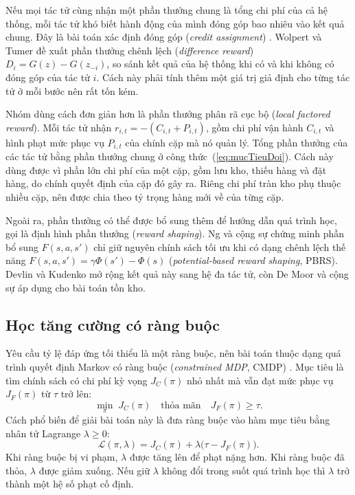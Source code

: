 Nếu mọi tác tử cùng nhận một phần thưởng chung là tổng chi phí của cả hệ thống, mỗi tác tử khó biết hành động của mình đóng góp bao nhiêu vào kết quả chung. Đây là bài toán xác định đóng góp (\textit{credit assignment}) \parencite{wolpert2001}. Wolpert và Tumer đề xuất phần thưởng chênh lệch (\textit{difference reward}) $D_i = G(z) - G(z_{-i})$, so sánh kết quả của hệ thống khi có và khi không có đóng góp của tác tử $i$. Cách này phải tính thêm một giá trị giả định cho từng tác tử ở mỗi bước nên rất tốn kém.

Nhóm dùng cách đơn giản hơn là phần thưởng phân rã cục bộ (\textit{local factored reward}). Mỗi tác tử nhận $r_{i,t} = -(C_{i,t} + P_{i,t})$, gồm chi phí vận hành $C_{i,t}$ và hình phạt mức phục vụ $P_{i,t}$ của chính cặp mà nó quản lý. Tổng phần thưởng của các tác tử bằng phần thưởng chung ở công thức~(\ref{eq:mucTieuDoi}). Cách này dùng được vì phần lớn chi phí của một cặp, gồm lưu kho, thiếu hàng và đặt hàng, do chính quyết định của cặp đó gây ra. Riêng chi phí tràn kho phụ thuộc nhiều cặp, nên được chia theo tỷ trọng hàng mới về của từng cặp.

Ngoài ra, phần thưởng có thể được bổ sung thêm để hướng dẫn quá trình học, gọi là định hình phần thưởng (\textit{reward shaping}). Ng và cộng sự \cite{ng1999} chứng minh phần bổ sung $F(s,a,s')$ chỉ giữ nguyên chính sách tối ưu khi có dạng chênh lệch thế năng $F(s,a,s') = \gamma\Phi(s') - \Phi(s)$ (\textit{potential-based reward shaping}, PBRS). Devlin và Kudenko \cite{devlin2011potential} mở rộng kết quả này sang hệ đa tác tử, còn De Moor và cộng sự \cite{demoor2022reward} áp dụng cho bài toán tồn kho.

\subsection{Học tăng cường có ràng buộc}
\label{subsec:cmdp}

Yêu cầu tỷ lệ đáp ứng tối thiểu là một ràng buộc, nên bài toán thuộc dạng quá trình quyết định Markov có ràng buộc (\textit{constrained MDP}, CMDP) \parencite{altman1999}. Mục tiêu là tìm chính sách có chi phí kỳ vọng $J_C(\pi)$ nhỏ nhất mà vẫn đạt mức phục vụ $J_F(\pi)$ từ $\tau$ trở lên:
\begin{equation}
    \min_{\pi}\; J_C(\pi) \quad \text{thỏa mãn} \quad J_F(\pi) \ge \tau.
    \label{eq:cmdp}
\end{equation}
Cách phổ biến để giải bài toán này là đưa ràng buộc vào hàm mục tiêu bằng nhân tử Lagrange $\lambda \ge 0$:
\begin{equation}
    \mathcal{L}(\pi, \lambda) = J_C(\pi) + \lambda \bigl(\tau - J_F(\pi)\bigr).
    \label{eq:lagrange}
\end{equation}
Khi ràng buộc bị vi phạm, $\lambda$ được tăng lên để phạt nặng hơn. Khi ràng buộc đã thỏa, $\lambda$ được giảm xuống. Nếu giữ $\lambda$ không đổi trong suốt quá trình học thì $\lambda$ trở thành một hệ số phạt cố định.

